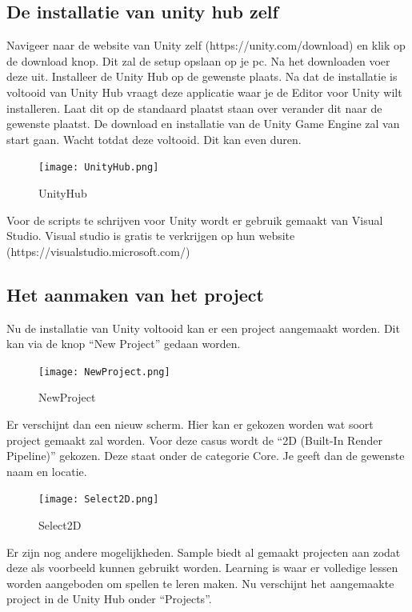 \subsection{De installatie van unity hub zelf}
Navigeer naar de website van Unity zelf (https://unity.com/download) en klik op de download knop. Dit zal de setup opslaan op je pc. Na het downloaden voer deze uit. Installeer de Unity Hub op de gewenste plaats. Na dat de installatie is voltooid van Unity Hub vraagt deze applicatie waar je de Editor voor Unity wilt installeren. Laat dit op de standaard plaatst staan over verander dit naar de gewenste plaatst. De download en installatie van de Unity Game Engine zal van start gaan. Wacht totdat deze voltooid. Dit kan even duren. 
\begin{figure}[H]
    \centering
    \texttt{[image: UnityHub.png]}
    \caption{UnityHub}
    \label{fig:UnityHub}
\end{figure}

Voor de scripts te schrijven voor Unity wordt er gebruik gemaakt van Visual Studio. Visual studio is gratis te verkrijgen op hun website (https://visualstudio.microsoft.com/)

\subsection{Het aanmaken van het project}
Nu de installatie van Unity voltooid kan er een project aangemaakt worden. Dit kan via de knop “New Project” gedaan worden.
\begin{figure}[H]
    \centering
    \texttt{[image: NewProject.png]}
    \caption{NewProject}
    \label{fig:NewProject}
\end{figure}

Er verschijnt dan een nieuw scherm. Hier kan er gekozen worden wat soort project gemaakt zal worden. Voor deze casus wordt de “2D (Built-In Render Pipeline)” gekozen. Deze staat onder de categorie Core. Je geeft dan de gewenste naam en locatie.

\begin{figure}[H]
    \centering
    \texttt{[image: Select2D.png]}
    \caption{Select2D}
    \label{fig:Select2D}
\end{figure}
Er zijn nog andere mogelijkheden. Sample biedt al gemaakt projecten aan zodat deze als voorbeeld kunnen gebruikt worden. Learning is waar er volledige lessen worden aangeboden om spellen te leren maken.
Nu verschijnt het aangemaakte project in de Unity Hub onder “Projects”.


